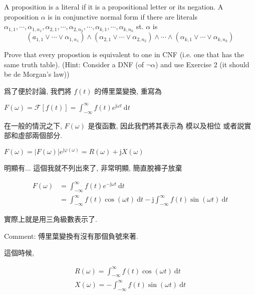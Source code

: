 \documentclass[a4paper, 10pt]{ctexbook} %
\begin{document}
A proposition is a literal if it is a propositional letter or its negation. 
A proposition $\alpha$ is in conjunctive normal form if there are literals $\alpha_{1, 1} , \cdots  , \alpha_{1 , n_{1} } , \alpha_{2 , 1 }, \cdots  , \alpha _{2, n_{2}} , \cdots  , \alpha_{k , 1} , \cdots  , \alpha_{k  , n _{k}}$  
st. $\alpha$ is 
$$ \left(a _{1 , 1} \vee \cdots  \vee \alpha_{1 , n_{1}}\right) \wedge \left(\alpha_{2, 1} \vee \cdots  \vee \alpha_{2, n _{2}}\right) \wedge \cdots  \wedge \left(\alpha_{k , 1} \vee \cdots  \vee \alpha_{k, n_{k}} \right)$$

Prove that every propostion is equivalent to one in CNF (i.e. one that has the same truth table). (Hint: Consider a DNF (of $\neg \alpha$) and use Exercise 2 (it should be de Morgan's law))  






爲了便於討論, 我們將 $f \left(t\right)$ 的傅里葉變換, 重寫為 

$F \left(\omega\right) = \mathscr F \left[  f\left(t\right) \right] = \int ^{\infty} _{- \infty} f\left(t\right) e ^{\mathrm{j} \omega t} \ \mathrm{d} t $

在一般的情況之下, $F\left(\omega\right)$ 是復函數, 因此我們將其表示為 模以及相位 或者説實部和虛部兩個部分. 

$F \left(\omega   \right)  = \left|  F \left(\omega\right) \right| e^{\mathrm{j}\varphi \left( \omega\right)}  = R \left(\omega\right) + \mathrm{j} X \left(\omega\right)$ 

明顯有... 這個我就不列出來了, 非常明顯, 簡直脫褲子放棄





$$ \begin{aligned} F\left(\omega\right) &  =  \int ^{\infty} _{- \infty} f \left(t\right) e ^{- \mathrm{ j} \omega t} \ \mathrm{d}t \\ &  = \int ^{\infty} _{- \infty   } f\left(t\right) \cos  \left(\omega t\right)  \ \mathrm{d} t -   \mathrm{ j} \int ^{\infty} _{- \infty} f\left(t\right) \sin \left(\omega t\right)  \ \mathrm{d} t \end{aligned} $$

實際上就是用三角級數表示了.

Comment: 傅里葉變換有沒有那個負號來著. 

這個時候, 


$$ \begin{gathered} R \left(\omega\right) = \int ^{\infty} _{- \infty} f\left(t\right) \cos  \left(\omega t\right)  \ \mathrm{d} t\\ X \left(\omega\right) = - \int ^{\infty} _{- \infty} f\left(t\right) \sin  \left(\omega t\right) \ \mathrm{d} t \end{gathered} $$
\end{document}
